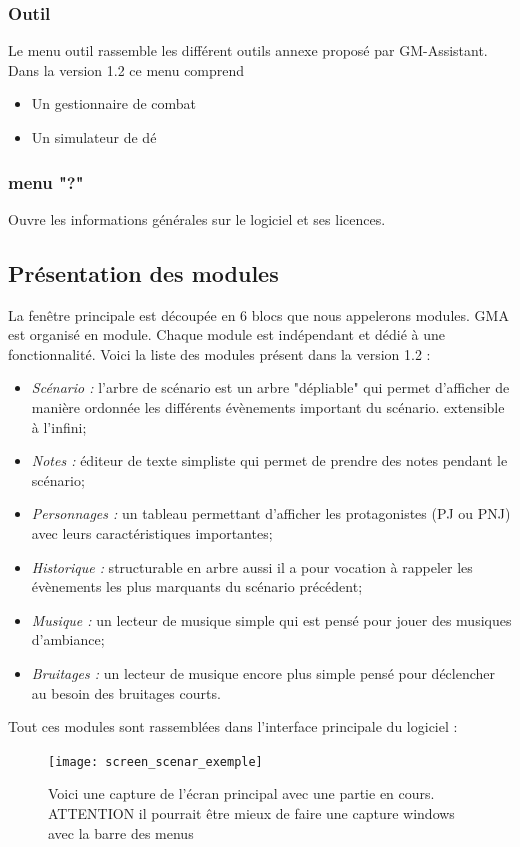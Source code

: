\documentclass[a4paper,12pt]{article}
\begin{document}
\subsubsection{Outil}
Le menu outil rassemble les différent outils annexe proposé par GM-Assistant.
Dans la version 1.2 ce menu comprend
\begin{itemize}
    \item Un gestionnaire de combat
    \item Un simulateur de dé
\end{itemize}

\subsubsection{menu "?"} Ouvre les informations générales sur le logiciel et ses licences.

\subsection{Présentation des modules}\label{modules}
La fenêtre principale est découpée en 6 blocs que nous appelerons modules.
GMA est organisé en module. Chaque module est indépendant et dédié à une fonctionnalité. Voici la liste des modules présent  dans la version 1.2 :
\begin{itemize}
    \item \emph{Scénario :} l'arbre de scénario est un arbre "dépliable" qui permet d'afficher de manière ordonnée les différents évènements important du scénario. extensible à l'infini;
    \item \emph{Notes :} éditeur de texte simpliste qui permet de prendre des notes pendant le scénario;
    \item \emph{Personnages :} un tableau permettant d'afficher les protagonistes (PJ ou PNJ) avec leurs caractéristiques importantes;
    \item \emph{Historique :} structurable en arbre aussi il a pour vocation à rappeler les évènements les plus marquants du scénario précédent;
    \item \emph{Musique :} un lecteur de musique simple qui est pensé pour jouer des musiques d'ambiance;
    \item \emph{Bruitages :} un lecteur de musique encore plus simple pensé pour déclencher au besoin des bruitages courts.
\end{itemize}
Tout ces modules sont rassemblées dans l'interface principale du logiciel :
\begin{figure}[h]
    \texttt{[image: screen\_scenar\_exemple]}
    \caption{Voici une capture de l'écran principal avec une partie en cours.
    ATTENTION il pourrait être mieux de faire une capture windows avec la barre des menus}
\end{figure}
\end{document}
